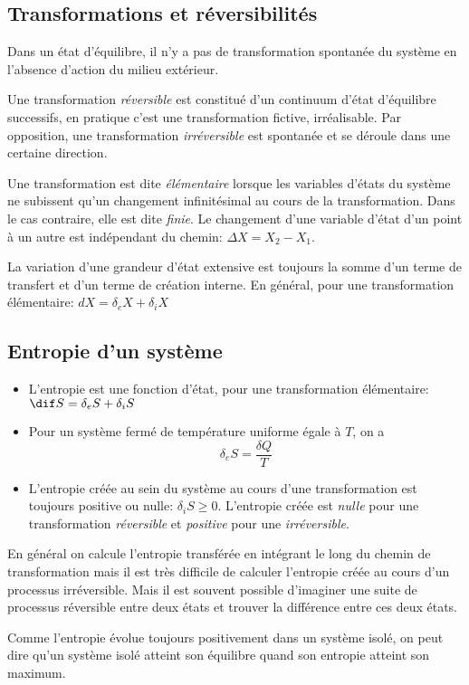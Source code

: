 \subsection{Transformations et réversibilités}
Dans un état d'équilibre, il n'y a pas de transformation spontanée du système
en l'absence d'action du milieu extérieur.

Une transformation \emph{réversible} est
constitué d'un continuum d'état d'équilibre
successifs, en pratique c'est une transformation fictive, irréalisable.
Par opposition, une transformation \emph{irréversible} est spontanée et
se déroule dans une certaine direction.

Une transformation est dite \emph{élémentaire} lorsque les variables d'états
du système ne subissent qu'un changement infinitésimal
au cours de la transformation.
Dans le cas contraire, elle est dite \emph{finie}.
Le changement d'une variable d'état d'un point à un autre est
indépendant du chemin:
$\Delta X = X_2 - X_1$.

La variation d'une grandeur d'état extensive est toujours
la somme d'un terme de transfert et d'un terme de création interne.
En général, pour une transformation élémentaire: $dX = \delta_eX+\delta_iX$
\subsection{Entropie d'un système}
\begin{itemize}
  \item L'entropie est une fonction d'état, pour une transformation élémentaire:
    $\dif S = \delta_eS+\delta_iS$ %
  \item Pour un système fermé de température uniforme égale à $T$,
    on a
    \[ \delta_eS = \frac{\delta Q}T \]
  \item L'entropie créée au sein du système au cours d'une transformation est
    toujours positive ou nulle: $\delta_iS \geq 0$.
    L'entropie créée est \emph{nulle} pour une transformation \emph{réversible}
    et \emph{positive} pour une \emph{irréversible}.
\end{itemize}
En général on calcule l'entropie transférée en intégrant
le long du chemin de transformation mais il est très difficile de
calculer l'entropie créée au cours d'un processus irréversible.
Mais il est souvent possible d'imaginer une suite de processus réversible
entre deux états et trouver la différence entre ces deux états.

Comme l'entropie évolue toujours positivement dans un système isolé,
on peut dire qu'un système isolé atteint son équilibre
quand son entropie atteint son maximum.


